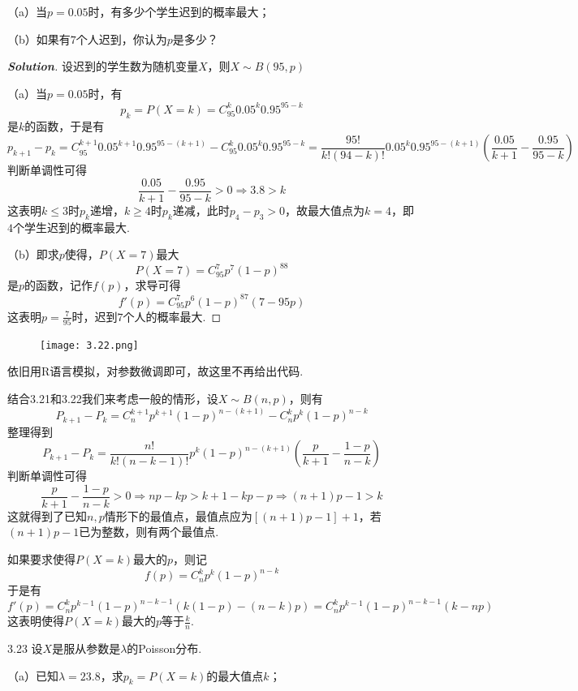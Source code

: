 \documentclass[10pt, a4paper, oneside]{ctexart}
\newenvironment{solution}{\begin{proof}[\bf Solution]}{\end{proof}}
\begin{document}
（a）当$p=0.05$时，有多少个学生迟到的概率最大；

（b）如果有$7$个人迟到，你认为$p$是多少？
\begin{solution}
设迟到的学生数为随机变量$X$，则$X\sim B(95,p)$

（a）当$p=0.05$时，有
\[{p_k} = P(X = k) = C_{95}^k{0.05^k}{0.95^{95 - k}}\]
是$k$的函数，于是有
\[{p_{k + 1}} - {p_k} = C_{95}^{k + 1}{0.05^{k + 1}}{0.95^{95 - (k + 1)}} - C_{95}^k{0.05^k}{0.95^{95 - k}} = \frac{{95!}}{{k!(94 - k)!}}{0.05^k}{0.95^{95 - (k + 1)}}\left( {\frac{{0.05}}{{k + 1}} - \frac{{0.95}}{{95 - k}}} \right)\]
判断单调性可得
\[\frac{{0.05}}{{k + 1}} - \frac{{0.95}}{{95 - k}} > 0 \Rightarrow 3.8 > k\]
这表明$k\leqslant 3$时$p_k$递增，$k\geqslant 4$时$p_k$递减，此时$p_4-p_3>0$，故最大值点为$k=4$，即$4$个学生迟到的概率最大.

（b）即求$p$使得，$P(X=7)$最大
\[P(X = 7) = C_{95}^7{p^7}{(1 - p)^{88}}\]
是$p$的函数，记作$f(p)$，求导可得
\[f'(p) = C_{95}^7{p^6}{(1 - p)^{87}}(7 - 95p)\]
这表明$p=\frac{7}{95}$时，迟到$7$个人的概率最大.
\end{solution}
\begin{figure}[H]
    \centering
    \texttt{[image: 3.22.png]}
\end{figure}
依旧用R语言模拟，对参数微调即可，故这里不再给出代码.
\begin{remark}
结合3.21和3.22我们来考虑一般的情形，设$X\sim B(n,p)$，则有
\[{P_{k + 1}} - {P_k} = C_n^{k + 1}{p^{k + 1}}{(1 - p)^{n - (k + 1)}} - C_n^k{p^k}{(1 - p)^{n - k}}\]
整理得到
\[{P_{k + 1}} - {P_k} = \frac{{n!}}{{k!(n - k - 1)!}}{p^k}{(1 - p)^{n - (k + 1)}}\left( {\frac{p}{{k + 1}} - \frac{{1 - p}}{{n - k}}} \right)\]
判断单调性可得
\[\frac{p}{{k + 1}} - \frac{{1 - p}}{{n - k}} > 0 \Rightarrow np - kp > k + 1 - kp - p \Rightarrow (n + 1)p - 1 > k\]
这就得到了已知$n,p$情形下的最值点，最值点应为$[(n + 1)p - 1] + 1$，若$(n + 1)p - 1$已为整数，则有两个最值点.

如果要求使得$P(X=k)$最大的$p$，则记
\[f(p) = C_n^k{p^k}{(1 - p)^{n - k}}\]
于是有
\[f'(p) = C_n^k{p^{k - 1}}{(1 - p)^{n - k - 1}}\left( {k(1 - p) - (n - k)p} \right) = C_n^k{p^{k - 1}}{(1 - p)^{n - k - 1}}(k - np)\]
这表明使得$P(X=k)$最大的$p$等于$\frac{k}{n}$.
\end{remark}

3.23 设$X$是服从参数是$\lambda$的Poisson分布.

（a）已知$\lambda=23.8$，求$p_k=P(X=k)$的最大值点$k$；
\end{document}

